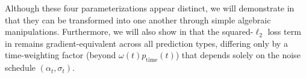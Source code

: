 Although these four parameterizations appear distinct, we will demonstrate in  that they can be transformed into one another through simple algebraic manipulations. Furthermore, we will also show in  that the squared-$\ell_2$ loss term in  remains gradient-equivalent across all prediction types, differing only by a time-weighting factor (beyond $\omega(t) p_{\mathrm{time}}(t)$) that depends solely on the noise schedule $(\alpha_t, \sigma_t)$.



\begin{table}[th]
  \caption{Summary of the Relationships Between Different Parameterizations.
All four parameterizations are mathematically equivalent and can be converted into one another through straightforward algebraic transformations.
}
  \small
  \centering
  \label{tb:A_t-B_t-parametrizations}
\end{table}



